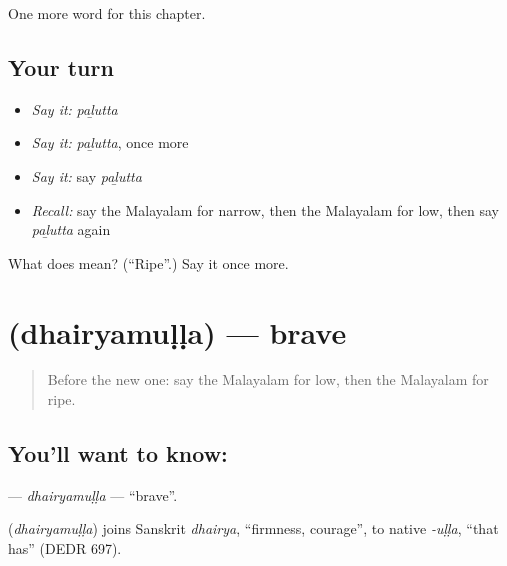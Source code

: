 \begin{grammarlens}[title={What you've built}]
One more word for this chapter.
\end{grammarlens}

\subsection*{Your turn}
\begin{itemize}
\raggedright
  \item \emph{Say it:} \emph{paḻutta}
  \item \emph{Say it:} \emph{paḻutta}, once more
  \item \emph{Say it:} say \emph{paḻutta}
  \item \emph{Recall:} say the Malayalam for narrow, then the Malayalam for low, then say \emph{paḻutta} again
\end{itemize}

\begin{tcolorbox}[breakable,colback=teal!4,colframe=teal!35!black,title={Before you move on}]
What does  mean? (\textquotedblleft{}Ripe\textquotedblright{}.) Say it once more.
\end{tcolorbox}
\section[\texorpdfstring{\ml{ധൈര്യമുള്ള} (dhairyamuḷḷa)}{ധൈര്യമുള്ള (dhairyamuḷḷa)}]{ (dhairyamuḷḷa) — brave}

\label{lesson:ML-C168-dhairyamulla}



\begin{quote}
Before the new one: say the Malayalam for low, then the Malayalam for ripe.
\end{quote}

\subsection*{You'll want to know: }
\textbf{} — \emph{dhairyamuḷḷa} — \textquotedblleft{}brave\textquotedblright{}.

\begin{cousinweb}
\textbf{} (\emph{dhairyamuḷḷa}) joins Sanskrit \emph{dhairya}, \textquotedblleft{}firmness, courage\textquotedblright{}, to native \emph{-uḷḷa}, \textquotedblleft{}that has\textquotedblright{} (DEDR 697).
\end{cousinweb}

